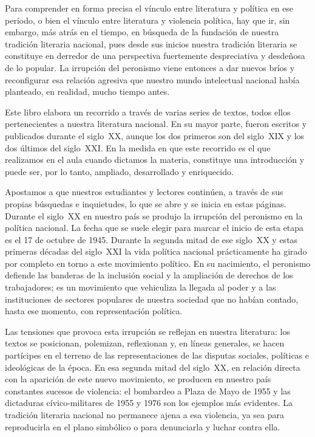 Para comprender en forma precisa el vínculo entre literatura y política en ese período, o bien el vínculo entre literatura y violencia política, hay que ir, sin embargo, más atrás en el tiempo, en búsqueda de la fundación de nuestra tradición literaria nacional, pues desde sus inicios nuestra tradición literaria se constituye en derredor de una perspectiva fuertemente despreciativa y desdeñosa de lo popular. La irrupción del peronismo viene entonces a dar nuevos bríos y reconfigurar esa relación agresiva que nuestro mundo intelectual nacional había planteado, en realidad, mucho tiempo antes.

Este libro elabora un recorrido a través de varias series de textos, todos ellos pertenecientes a nuestra literatura nacional. En su mayor parte, fueron escritos y publicados durante el siglo~XX, aunque los dos primeros son del siglo~XIX y los dos últimos del siglo~XXI. En la medida en que este recorrido es el que realizamos en el aula cuando dictamos la materia, constituye una introducción y puede ser, por lo tanto, ampliado, desarrollado y enriquecido.

Apostamos a que nuestros estudiantes y lectores continúen, a través de sus propias búsquedas e inquietudes, lo que se abre y se inicia en estas páginas. Durante el siglo~XX en nuestro país se produjo la irrupción del peronismo en la política nacional. La fecha que se suele elegir para marcar el inicio de esta etapa es el 17 de octubre de 1945. Durante la segunda mitad de ese siglo~XX y estas primeras décadas del siglo~XXI la vida política nacional prácticamente ha girado por completo en torno a este movimiento político. En su nacimiento, el peronismo defiende las banderas de la inclusión social y la ampliación de derechos de los trabajadores; es un movimiento que vehiculiza la llegada al poder y a las instituciones de sectores populares de nuestra sociedad que no habían contado, hasta ese momento, con representación política.

Las tensiones que provoca esta irrupción se reflejan en nuestra literatura: los textos se posicionan, polemizan, reflexionan y, en líneas generales, se hacen partícipes en el terreno de las representaciones de las disputas sociales, políticas e ideológicas de la época. En esa segunda mitad del siglo~XX, en relación directa con la aparición de este nuevo movimiento, se producen en nuestro país constantes sucesos de violencia: el bombardeo a Plaza de Mayo de 1955 y las dictaduras cívico-militares de 1955 y 1976 son los ejemplos más evidentes. La tradición literaria nacional no permanece ajena a esa violencia, ya sea para reproducirla en el plano simbólico o para denunciarla y luchar contra ella.

